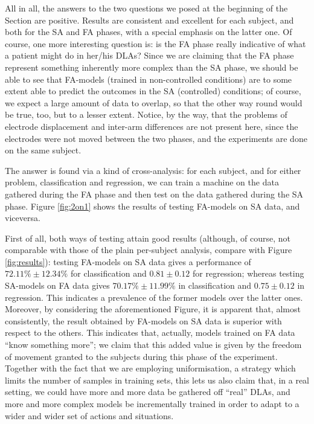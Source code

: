 \documentclass[10pt]{bmc_article}
\def\texttt{[image: ]}
\newenvironment{bmcformat}{\begin{raggedright}\baselineskip20pt\sloppy\setboolean{publ}{false}}{\end{raggedright}\baselineskip20pt\sloppy}
\begin{document}
\begin{bmcformat}
All in all, the answers to the two questions we posed at the beginning
of the Section are positive. Results are consistent and excellent for
each subject, and both for the SA and FA phases, with a special
emphasis on the latter one. Of course, one more interesting question
is: is the FA phase really indicative of what a patient might do in
her/his DLAs? Since we are claiming that the FA phase represent
something inherently more complex than the SA phase, we should be able
to see that FA-models (trained in non-controlled conditions) are to
some extent able to predict the outcomes in the SA (controlled)
conditions; of course, we expect a large amount of data to overlap, so
that the other way round would be true, too, but to a lesser
extent. Notice, by the way, that the problems of electrode
displacement and inter-arm differences are not present here, since the
electrodes were not moved between the two phases, and the experiments
are done on the same subject.

The answer is found via a kind of cross-analysis: for each subject,
and for either problem, classification and regression, we can train a
machine on the data gathered during the FA phase and then test on the
data gathered during the SA phase. Figure \ref{fig:2on1} shows the
results of testing FA-models on SA data, and viceversa.


First of all, both ways of testing attain good results (although, of
course, not comparable with those of the plain per-subject analysis,
compare with Figure \ref{fig:results}): testing FA-models on SA data
gives a performance of $72.11\% \pm 12.34\%$ for classification and
$0.81 \pm 0.12$ for regression; whereas testing SA-models on FA data
gives $70.17\% \pm 11.99\%$ in classification and $0.75 \pm 0.12$ in
regression. This indicates a prevalence of the former models over the
latter ones. Moreover, by considering the aforementioned Figure, it is
apparent that, almost consistently, the result obtained by FA-models
on SA data is superior with respect to the others. This indicates
that, actually, models trained on FA data ``know something more''; we
claim that this added value is given by the freedom of movement
granted to the subjects during this phase of the experiment. Together
with the fact that we are employing uniformisation, a strategy which
limits the number of samples in training sets, this lets us also claim
that, in a real setting, we could have more and more data be gathered
off ``real'' DLAs, and more and more complex models be incrementally
trained in order to adapt to a wider and wider set of actions and
situations.


\end{bmcformat}
\end{document}
